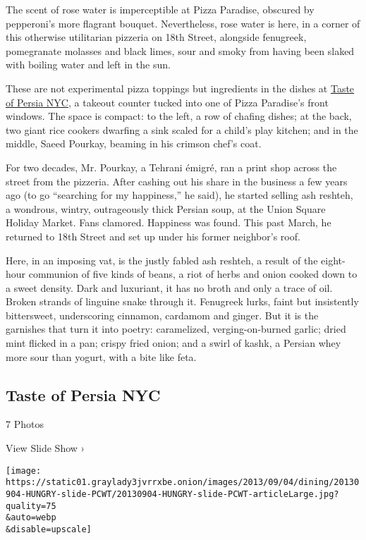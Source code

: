 The scent of rose water is imperceptible at Pizza Paradise, obscured by
pepperoni's more flagrant bouquet. Nevertheless, rose water is here, in
a corner of this otherwise utilitarian pizzeria on 18th Street,
alongside fenugreek, pomegranate molasses and black limes, sour and
smoky from having been slaked with boiling water and left in the sun.

These are not experimental pizza toppings but ingredients in the dishes
at \href{https://www.facebookcorewwwi.onion/TasteOfPersiaNYC}{Taste of
Persia NYC}, a takeout counter tucked into one of Pizza Paradise's front
windows. The space is compact: to the left, a row of chafing dishes; at
the back, two giant rice cookers dwarfing a sink scaled for a child's
play kitchen; and in the middle, Saeed Pourkay, beaming in his crimson
chef's coat.

For two decades, Mr. Pourkay, a Tehrani émigré, ran a print shop across
the street from the pizzeria. After cashing out his share in the
business a few years ago (to go ``searching for my happiness,'' he
said), he started selling ash reshteh, a wondrous, wintry, outrageously
thick Persian soup, at the Union Square Holiday Market. Fans clamored.
Happiness was found. This past March, he returned to 18th Street and set
up under his former neighbor's roof.

Here, in an imposing vat, is the justly fabled ash reshteh, a result of
the eight-hour communion of five kinds of beans, a riot of herbs and
onion cooked down to a sweet density. Dark and luxuriant, it has no
broth and only a trace of oil. Broken strands of linguine snake through
it. Fenugreek lurks, faint but insistently bittersweet, underscoring
cinnamon, cardamom and ginger. But it is the garnishes that turn it into
poetry: caramelized, verging-on-burned garlic; dried mint flicked in a
pan; crispy fried onion; and a swirl of kashk, a Persian whey more sour
than yogurt, with a bite like feta.

\href{https://www.nytimes3xbfgragh.onion/slideshow/2013/09/04/dining/20130904-HUNGRY.html}{}

\hypertarget{taste-of-persia-nyc}{%
\subsection{Taste of Persia NYC}\label{taste-of-persia-nyc}}

7 Photos

View Slide Show ›

\texttt{[image: https://static01.graylady3jvrrxbe.onion/images/2013/09/04/dining/20130904-HUNGRY-slide-PCWT/20130904-HUNGRY-slide-PCWT-articleLarge.jpg?quality=75\\\&auto=webp\\\&disable=upscale]}

